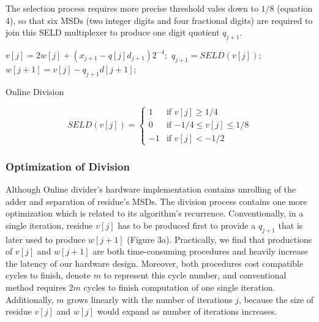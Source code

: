 \documentclass{sig-alternate}
\begin{document}
	
	 The selection process requires more precise threshold vales down to $1/8$ (equation 4), so that six MSDs (two integer digits and four fractional digits) are required to join this SELD multiplexer to produce one digit quotient $q_{j+1}$.  

	          
  
  \begin{algorithm}
		  	\begin{algorithmic}[1]
		  		\newline
		  		
		  		\State $v[j] = 2w[j] + (x_{j+1}-q[j]d_{j+1})2^{-4};$
		  		\State $q_{j+1} = SELD(v[j]);$
		  		\State $w[j+1] = v[j] - q_{j+1}d[j+1];$
		  		\EndFor
		  	\end{algorithmic}
		  	\caption{Online Division}
		  	\label{alg:algorithm2}
  \end{algorithm}	
  \begin{equation}
  SELD (v[j]) = \begin{cases}
  1 &\text{if $v[j] \geq 1/4$}\\
  0 &\text{if $-1/4 \leq v[j] \leq1/8$}\\
  -1 &\text{if $v[j]<-1/2$ }
  \end{cases} 
  \end{equation}
  
  \subsubsection{Optimization of Division}
  	Although Online divider's hardware implementation contains unrolling of the adder and separation of residue's MSDs. The division process contains one more optimization which is related to its algorithm's recurrence. Conventionally, in a single iteration, residue $v[j]$ has to be produced first to provide a $q_{j+1}$ that is later used to produce $w[j+1]$ (Figure 3a). Practically, we find that productions of $v[j]$ and $w[j+1]$ are both time-consuming procedures and heavily increase the latency of our hardware design. Moreover, both procedures cost compatible cycles to finish, denote $m$ to represent this cycle number, and conventional method requires $2m$ cycles to finish computation of one single iteration. Additionally, $m$ grows linearly with the number of iterations $j$, because the size of residue $v[j]$ and $w[j]$ would expand as number of iterations increases.    
   	
\end{document}
